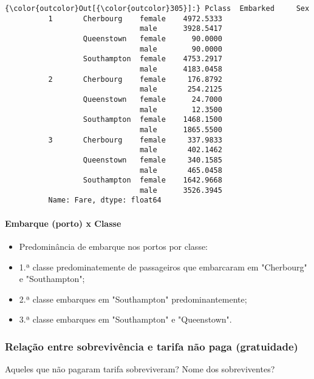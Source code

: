 \documentclass[11pt]{article}
\providecommand{\tightlist}{%
      \setlength{\itemsep}{0pt}\setlength{\parskip}{0pt}}
\begin{document}
\begin{Verbatim}[commandchars=\\\{\}]
{\color{outcolor}Out[{\color{outcolor}305}]:} Pclass  Embarked     Sex   
          1       Cherbourg    female    4972.5333
                               male      3928.5417
                  Queenstown   female      90.0000
                               male        90.0000
                  Southampton  female    4753.2917
                               male      4183.0458
          2       Cherbourg    female     176.8792
                               male       254.2125
                  Queenstown   female      24.7000
                               male        12.3500
                  Southampton  female    1468.1500
                               male      1865.5500
          3       Cherbourg    female     337.9833
                               male       402.1462
                  Queenstown   female     340.1585
                               male       465.0458
                  Southampton  female    1642.9668
                               male      3526.3945
          Name: Fare, dtype: float64
\end{Verbatim}
            
    \paragraph{Embarque (porto) x Classe}\label{embarque-porto-x-classe}

\begin{itemize}
\tightlist
\item
  Predominância de embarque nos portos por classe:
\item
  1.ª classe predominatemente de passageiros que embarcaram em
  "Cherbourg" e "Southampton";
\item
  2.ª classe embarques em "Southampton" predominantemente;
\item
  3.ª classe embarques em "Southampton" e "Queenstown".
\end{itemize}

    \subsubsection{Relação entre sobrevivência e tarifa não paga
(gratuidade)}\label{relauxe7uxe3o-entre-sobrevivuxeancia-e-tarifa-nuxe3o-paga-gratuidade}

Aqueles que não pagaram tarifa sobreviveram? Nome dos sobreviventes?
\end{document}
